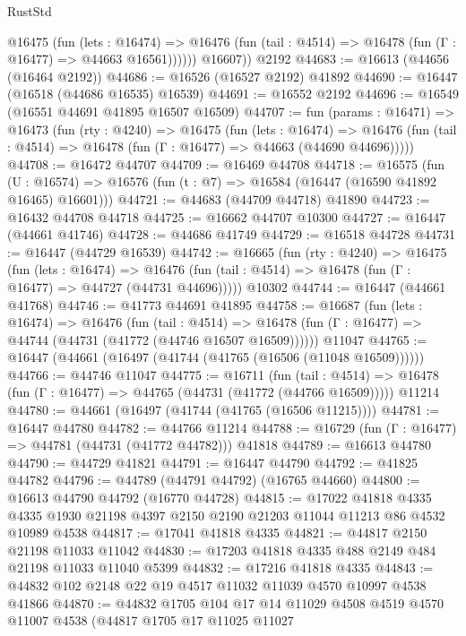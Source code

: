 \begin{lexlean}{RustStd}
\begin{coremodule}
{\begin{coremodule}
{{{{{{{{{{{{{{{{{{{{{{{{{{{{{{{{{{{{{{{{{{{{{{{{{{{{{{{            @16475
              (fun (lets : @16474) =>
              @16476 (fun (tail : @4514) => @16478 (fun (Γ : @16477) => @44663 @16561))))))
        @16607))
    @2192
@44683 := @16613 (@44656 (@16464 @2192))
@44686 := @16526 (@16527 @2192) @41892
@44690 := @16447 (@16518 (@44686 @16535) @16539)
@44691 := @16552 @2192
@44696 := @16549 (@16551 @44691 @41895 @16507 @16509)
@44707 := fun (params : @16471) =>
  @16473
    (fun (rty : @4240) =>
    @16475
      (fun (lets : @16474) =>
      @16476 (fun (tail : @4514) => @16478 (fun (Γ : @16477) => @44663 (@44690 @44696)))))
@44708 := @16472 @44707
@44709 := @16469 @44708
@44718 := @16575
    (fun (U : @16574) => @16576 (fun (t : @7) => @16584 (@16447 (@16590 @41892 @16465) @16601)))
@44721 := @44683 (@44709 @44718) @41890
@44723 := @16432 @44708 @44718
@44725 := @16662 @44707 @10300
@44727 := @16447 (@44661 @41746)
@44728 := @44686 @41749
@44729 := @16518 @44728
@44731 := @16447 (@44729 @16539)
@44742 := @16665
    (fun (rty : @4240) =>
    @16475
      (fun (lets : @16474) =>
      @16476 (fun (tail : @4514) => @16478 (fun (Γ : @16477) => @44727 (@44731 @44696)))))
    @10302
@44744 := @16447 (@44661 @41768)
@44746 := @41773 @44691 @41895
@44758 := @16687
    (fun (lets : @16474) =>
    @16476
      (fun (tail : @4514) =>
      @16478 (fun (Γ : @16477) => @44744 (@44731 (@41772 (@44746 @16507 @16509))))))
    @11047
@44765 := @16447 (@44661 (@16497 (@41744 (@41765 (@16506 (@11048 @16509))))))
@44766 := @44746 @11047
@44775 := @16711
    (fun (tail : @4514) => @16478 (fun (Γ : @16477) => @44765 (@44731 (@41772 (@44766 @16509)))))
    @11214
@44780 := @44661 (@16497 (@41744 (@41765 (@16506 @11215))))
@44781 := @16447 @44780
@44782 := @44766 @11214
@44788 := @16729 (fun (Γ : @16477) => @44781 (@44731 (@41772 @44782))) @41818
@44789 := @16613 @44780
@44790 := @44729 @41821
@44791 := @16447 @44790
@44792 := @41825 @44782
@44796 := @44789 (@44791 @44792) (@16765 @44660)
@44800 := @16613 @44790 @44792 (@16770 @44728)
@44815 := @17022
    @41818
    @4335
    @4335
    @1930
    @21198
    @4397
    @2150
    @2190
    @21203
    @11044
    @11213
    @86
    @4532
    @10989
    @4538
@44817 := @17041 @41818 @4335
@44821 := @44817 @2150 @21198 @11033 @11042
@44830 := @17203 @41818 @4335 @488 @2149 @484 @21198 @11033 @11040 @5399
@44832 := @17216 @41818 @4335
@44843 := @44832 @102 @2148 @22 @19 @4517 @11032 @11039 @4570 @10997 @4538 @41866
@44870 := @44832
    @1705
    @104
    @17
    @14
    @11029
    @4508
    @4519
    @4570
    @11007
    @4538
    (@44817
      @1705
      @17
      @11025
      @11027
}}}}}}}}}}}}}}}}}}}}}}}}}}}}}}}}}}}}}}}}}}}}}}}}}}}}}}}
\end{coremodule}}
\end{coremodule}
\end{lexlean}
